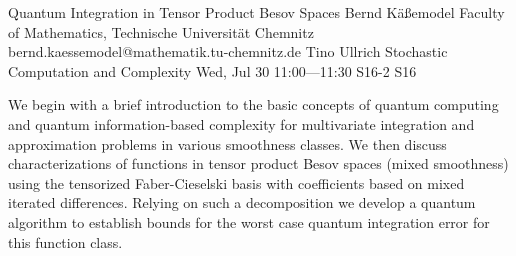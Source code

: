 \begin{talk}
  {Quantum Integration in Tensor Product  Besov Spaces}%
  {Bernd K\"a{\ss}emodel}%
  {Faculty of Mathematics, Technische Universit\"at Chemnitz}%
  {bernd.kaessemodel@mathematik.tu-chemnitz.de}%
  {Tino Ullrich}%
  {Stochastic Computation and Complexity}%
  {Wed, Jul 30 11:00---11:30}%
  {S16-2}%
  {S16}%
    

We begin with a brief introduction to the basic concepts of quantum computing and quantum information-based complexity for multivariate integration and approximation problems in various smoothness classes. We then discuss characterizations of functions in tensor product Besov spaces (mixed smoothness) using the tensorized Faber-Cieselski basis with coefficients based on mixed iterated differences. Relying on such a decomposition we develop a quantum algorithm to establish bounds for the worst case quantum integration error for this function class. 

\medskip
%
%
\end{talk}

